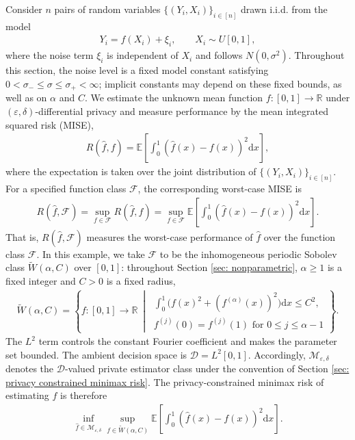 \documentclass[letterpaper,12pt]{article}
\renewcommand{\d}{\mathrm{d}}
\numberwithin{equation}{section}
\theoremstyle{plain}
\numberwithin{Theorem}{section}
\numberwithin{proposition}{section}
\numberwithin{Lemma}{section}
{
	\theoremstyle{definition}
	\newtheorem{Definition}{Definition}
	\newtheorem{example}{Example}
	\numberwithin{example}{section}
	\newtheorem{fact}{Fact}
	\numberwithin{fact}{section}
	\newtheorem{remark}{Remark}
}
\newcommand{\furtherrev}[1]{#1}
\newcommand{\1}{\mathbbm{1}}
\def\R{{\mathbb R}}
\def\E{\mathbb{E}}
\begin{document}
Consider $n$ pairs of random variables $\{(Y_i, X_i)\}_{i \in [n]}$ drawn i.i.d. from the model
	\begin{align*}
			Y_i = f(X_i) + \xi_i,\qquad X_i \sim U[0, 1],
	\end{align*}  
		where the noise term $\xi_i$ is independent of $X_i$ and follows $N(0, \sigma^2)$. Throughout this section, the noise level is a fixed model constant satisfying $0<\sigma_-\leq\sigma\leq\sigma_+<\infty$; implicit constants may depend on these fixed bounds, as well as on $\alpha$ and $C$. We estimate the unknown mean function $f: [0, 1] \to \R$ under $(\varepsilon, \delta)$-differential privacy and measure performance by the mean integrated squared risk (MISE),
	\begin{align*}
		R(\hat f, f) = \E \left[ \int_0^1 (\hat f(x) - f(x))^2 \d x \right],
	\end{align*}
	where the expectation is taken over the joint distribution of $\{(Y_i, X_i)\}_{i \in [n]}$. For a specified function class $\mathcal F$, the corresponding worst-case MISE is
	\begin{align*}
		R(\hat f, \mathcal F) = \sup_{f \in \mathcal F} 	R(\hat f, f) = \sup_{f \in \mathcal F}\E \left[ \int_0^1 (\hat f(x) - f(x))^2 \d x \right].
	\end{align*}
	That is, $R(\hat f, \mathcal F)$ measures the worst-case performance of $\hat f$ over the function class $\mathcal F$.
	{In this example, we take $\mathcal F$ to be the inhomogeneous periodic Sobolev class $\tilde W(\alpha, C)$ over $[0, 1]$: \furtherrev{throughout Section \ref{sec: nonparametric}, $\alpha\geq1$ is a fixed integer and $C>0$ is a fixed radius},
	\begin{align*}
		\tilde W(\alpha, C) = \left\{f:[0, 1] \to \R\ \middle|\
		\begin{array}{l}
		\displaystyle \int_0^1 \bigl(f(x)^2+(f^{(\alpha)}(x))^2\bigr)\d x\leq C^2,\\[2pt]
		 f^{(j)}(0)=f^{(j)}(1)\text{ for }0\leq j\leq\alpha-1
		\end{array}\right\}.
	\end{align*}
	The $L^2$ term controls the constant Fourier coefficient and makes the parameter set bounded.}
	\furtherrev{The ambient decision space is $\mathcal D=L^2[0,1]$. Accordingly, $\mathcal M_{\varepsilon,\delta}$ denotes the $\mathcal D$-valued private estimator class under the convention of Section \ref{sec: privacy constrained minimax risk}.} The privacy-constrained minimax risk of estimating $f$ is therefore
	\begin{align*}
		 \inf_{\hat f \in \mathcal M_{\varepsilon, \delta}} \sup_{f \in \tilde W(\alpha, C)} \E \left[ \int_0^1 (\hat f(x) - f(x))^2 \d x \right].
	\end{align*}
	
\end{document}
